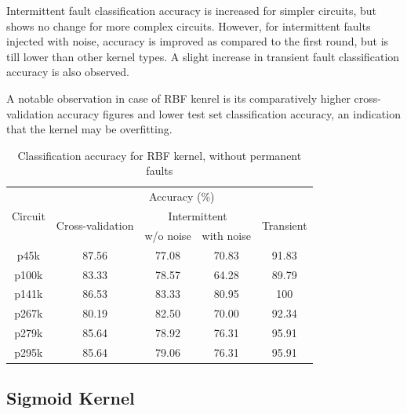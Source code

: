 Intermittent fault classification accuracy is increased for simpler circuits, but shows no change for more complex circuits. However, for intermittent faults injected with noise, accuracy is improved as compared to the first round, but is till lower than other kernel types. A slight increase in transient fault classification accuracy is also observed. 

A notable observation in case of RBF kenrel is its comparatively higher cross-validation accuracy figures and lower test set classification accuracy, an indication that the kernel may be overfitting.

\begin{table}[h]
	\captionsetup{justification=centering}
\begin{tabular}{ccccc}
\hline
\multirow{3}{*}{Circuit} & \multicolumn{4}{c}{Accuracy (\%)}                                                                 \\ \cline{2-5} 
                         & \multirow{2}{*}{Cross-validation} & \multicolumn{2}{c}{Intermittent} & \multirow{2}{*}{Transient} \\ \cline{3-4}
                         &                                   & w/o noise      & with noise      &                            \\ \hline
p45k                     & 87.56                             & 77.08          & 70.83           & 91.83                      \\
p100k                    & 83.33                             & 78.57          & 64.28           & 89.79                      \\
p141k                    & 86.53                             & 83.33          & 80.95           & 100                        \\
p267k                    & 80.19                             & 82.50          & 70.00           & 92.34                      \\
p279k                    & 85.64                             & 78.92          & 76.31           & 95.91                      \\
p295k                    & 85.64                             & 79.06          & 76.31           & 95.91  						  \\
\hline
\end{tabular}
\caption {Classification accuracy for RBF kernel, without permanent faults}
\label{tab:rbfwop}
\end{table}


\subsection{Sigmoid Kernel}

